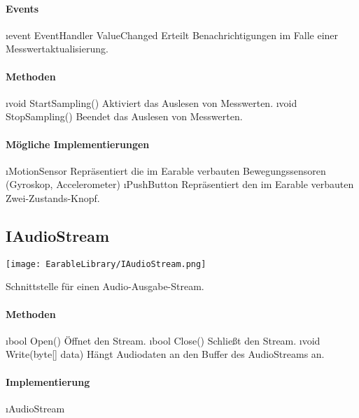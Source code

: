 \documentclass[../entwurf.tex]{subfiles}
\begin{document}
\paragraph{Events}
\begin{itemize}
	\i{event EventHandler ValueChanged} Erteilt Benachrichtigungen im Falle einer Messwertaktualisierung.
\end{itemize}
\paragraph{Methoden}
\begin{itemize}
	\i{void StartSampling()} Aktiviert das Auslesen von Messwerten.
	\i{void StopSampling()} Beendet das Auslesen von Messwerten.
\end{itemize}
\paragraph{Mögliche Implementierungen}
\begin{itemize}
	\i{MotionSensor} Repräsentiert die im Earable verbauten Bewegungssensoren (Gyroskop, Accelerometer)
	\i{PushButton} Repräsentiert den im Earable verbauten Zwei-Zustands-Knopf.
\end{itemize}

\subsection{IAudioStream}
\begin{center}
	\texttt{[image: EarableLibrary/IAudioStream.png]}
\end{center}
Schnittstelle für einen Audio-Ausgabe-Stream.
\paragraph{Methoden}
\begin{itemize}
	\i{bool Open()} Öffnet den Stream.
	\i{bool Close()} Schließt den Stream.
	\i{void Write(byte[] data)} Hängt Audiodaten an den Buffer des AudioStreams an.
\end{itemize}
\paragraph{Implementierung}
\begin{itemize}
	\i{AudioStream}
\end{itemize}
\end{document}
